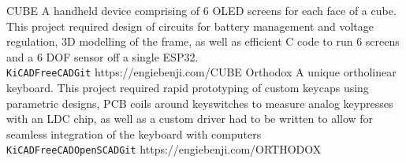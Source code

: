 \documentclass[9pt]{developercv} %
\begin{document}

	\begin{entrylist}
		\QRentry
			{CUBE}
			{A handheld device comprising of 6 OLED screens for each face of a cube. This project required design of circuits for battery management and voltage regulation, 3D modelling of the frame, as well as efficient C code to run 6 screens and a 6 DOF sensor off a single ESP32.\\ \texttt{KiCAD}\slashsep\texttt{FreeCAD}\slashsep\texttt{Git}}
			{https://engiebenji.com/CUBE}
		\QRentry
			{Orthodox}
			{A unique ortholinear keyboard. This project required rapid prototyping of custom keycaps using parametric designs, PCB coils around keyswitches to measure analog keypresses with an LDC chip, as well as a custom driver had to be written to allow for seamless integration of the keyboard with computers \\\texttt{KiCAD}\slashsep\texttt{FreeCAD}\slashsep\texttt{OpenSCAD}\slashsep\texttt{Git}}
			{https://engiebenji.com/ORTHODOX}
	\end{entrylist}


\end{document}

